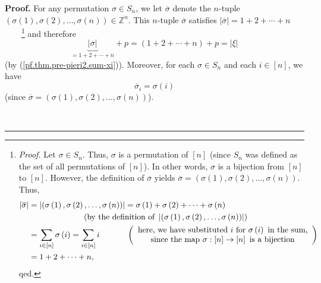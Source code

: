 \documentclass[numbers=enddot,12pt,final,onecolumn,notitlepage,english]{scrartcl}%
\theoremstyle{definition}
\newenvironment{proof}[1][Proof]{\noindent\textbf{#1.} }{\ \rule{0.5em}{0.5em}}
\let\sumnonlimits\sum
\renewcommand{\sum}{\sumnonlimits\limits}
\newenvironment{verlong}{}{}
\begin{document}
\begin{verlong}
\begin{proof}
For any permutation $\sigma\in S_{n}$, we let $\overline{\sigma}$ denote the
$n$-tuple $\left(  \sigma\left(  1\right)  ,\sigma\left(  2\right)
,\ldots,\sigma\left(  n\right)  \right)  \in\mathbb{Z}^{n}$. This $n$-tuple
$\overline{\sigma}$ satisfies $\left\vert \overline{\sigma}\right\vert
=1+2+\cdots+n$\ \ \ \ \footnote{\textit{Proof.} Let $\sigma\in S_{n}$. Thus,
$\sigma$ is a permutation of $\left[  n\right]  $ (since $S_{n}$ was defined
as the set of all permutations of $\left[  n\right]  $). In other words,
$\sigma$ is a bijection from $\left[  n\right]  $ to $\left[  n\right]  $.
However, the definition of $\overline{\sigma}$ yields $\overline{\sigma
}=\left(  \sigma\left(  1\right)  ,\sigma\left(  2\right)  ,\ldots
,\sigma\left(  n\right)  \right)  $. Thus,%
\begin{align*}
\left\vert \overline{\sigma}\right\vert  &  =\left\vert \left(  \sigma\left(
1\right)  ,\sigma\left(  2\right)  ,\ldots,\sigma\left(  n\right)  \right)
\right\vert =\sigma\left(  1\right)  +\sigma\left(  2\right)  +\cdots
+\sigma\left(  n\right) \\
&  \ \ \ \ \ \ \ \ \ \ \ \ \ \ \ \ \ \ \ \ \left(  \text{by the definition of
}\left\vert \left(  \sigma\left(  1\right)  ,\sigma\left(  2\right)
,\ldots,\sigma\left(  n\right)  \right)  \right\vert \right) \\
&  =\sum_{i\in\left[  n\right]  }\sigma\left(  i\right)  =\sum_{i\in\left[
n\right]  }i\ \ \ \ \ \ \ \ \ \ \left(
\begin{array}
[c]{c}%
\text{here, we have substituted }i\text{ for }\sigma\left(  i\right)  \text{
in the sum,}\\
\text{since the map }\sigma:\left[  n\right]  \rightarrow\left[  n\right]
\text{ is a bijection}%
\end{array}
\right) \\
&  =1+2+\cdots+n,
\end{align*}
qed.} and therefore
\begin{equation}
\underbrace{\left\vert \overline{\sigma}\right\vert }_{=1+2+\cdots
+n}+p=\left(  1+2+\cdots+n\right)  +p=\left\vert \xi\right\vert
\label{pf.thm.pre-pieri2.modsigbar1}%
\end{equation}
(by (\ref{pf.thm.pre-pieri2.sum-xi})). Moreover, for each $\sigma\in S_{n}$
and each $i\in\left[  n\right]  $, we have%
\begin{equation}
\overline{\sigma}_{i}=\sigma\left(  i\right)
\label{pf.thm.pre-pieri2.sigbari}%
\end{equation}
(since $\overline{\sigma}=\left(  \sigma\left(  1\right)  ,\sigma\left(
2\right)  ,\ldots,\sigma\left(  n\right)  \right)  $).


\end{proof}
\end{verlong}
\end{document}
